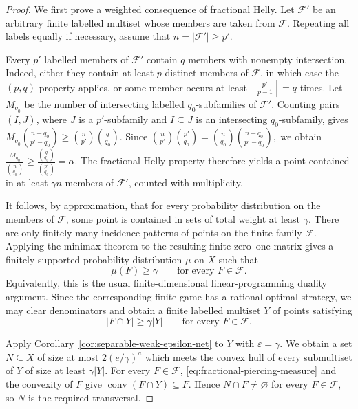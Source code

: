 \documentclass[11pt]{article}
\theoremstyle{definition}
\newcommand{\F}{\mathcal{F}}
\newcommand{\conv}{\operatorname{conv}}
\begin{document}
\begin{proof}
We first prove a weighted consequence of fractional Helly.  Let
$\F'$ be an arbitrary finite labelled multiset whose members are
taken from $\F$.  Repeating all labels equally if necessary, assume
that $n=|\F'|\ge p'$.

Every $p'$ labelled members of $\F'$ contain $q$ members with
nonempty intersection.  Indeed, either they contain at least $p$
distinct members of $\F$, in which case the $(p,q)$-property applies,
or some member occurs at least
$\left\lceil\frac{p'}{p-1}\right\rceil=q$
times.  Let $M_{q_0}$ be the number of intersecting labelled
$q_0$-subfamilies of $\F'$.  Counting pairs $(I,J)$, where $J$ is a
$p'$-subfamily and $I\subseteq J$ is an intersecting
$q_0$-subfamily, gives
$M_{q_0}\binom{n-q_0}{p'-q_0}
\ge
\binom n{p'}\binom q{q_0}.$
Since
$\binom n{p'}\binom{p'}{q_0}
=
\binom n{q_0}\binom{n-q_0}{p'-q_0},$
we obtain
$\frac{M_{q_0}}{\binom n{q_0}}
\ge
\frac{\binom q{q_0}}{\binom{p'}{q_0}}
=
\alpha.$
The fractional Helly property therefore yields a point contained in
at least $\gamma n$ members of $\F'$, counted with multiplicity.

It follows, by approximation, that for every probability distribution
on the members of $\F$, some point is contained in sets of total
weight at least $\gamma$.  There are only finitely many incidence
patterns of points on the finite family $\F$.  Applying the minimax
theorem to the resulting finite zero--one matrix gives a finitely
supported probability distribution $\mu$ on $X$ such that
\[
\mu(F)\ge\gamma
\qquad\text{for every }F\in\F.
\]
Equivalently, this is the usual finite-dimensional linear-programming
duality argument.  Since the corresponding finite game has a rational
optimal strategy, we may clear denominators and obtain a finite
labelled multiset $Y$ of points satisfying
\begin{equation}\label{eq:fractional-piercing-measure}
|F\cap Y|\ge\gamma|Y|
\qquad\text{for every }F\in\F.
\end{equation}

Apply Corollary~\ref{cor:separable-weak-epsilon-net} to $Y$ with
$\varepsilon=\gamma$.  We obtain a set $N\subseteq X$ of size at most
$2(e/\gamma)^a$ which meets the convex hull of every submultiset of
$Y$ of size at least $\gamma|Y|$.  For every $F\in\F$,
\eqref{eq:fractional-piercing-measure} and the convexity of $F$ give
$\conv(F\cap Y)\subseteq F.$
Hence $N\cap F\ne\varnothing$ for every $F\in\F$, so $N$ is the
required transversal.
\end{proof}
\end{document}
